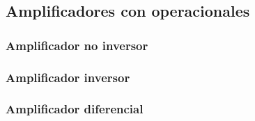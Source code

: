 
\subsection{Amplificadores con operacionales}


\subsubsection{Amplificador no inversor}


\subsubsection{Amplificador inversor}


\subsubsection{Amplificador diferencial}